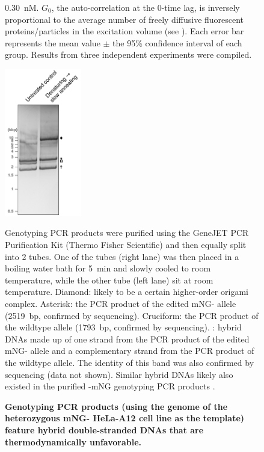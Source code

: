 \begin{figure}
\SI{0.30}{nM}. $G_0$, the auto-correlation at the 0-time lag, is inversely proportional to the average number of freely diffusive fluorescent proteins/particles in the excitation volume (see ). Each error bar represents the mean value $\pm$ the 95\% confidence interval of each group. Results from three independent experiments were compiled.
\end{figure}

\begin{figure}
    \centering
    \includegraphics[width=0.3\textwidth]{chapters/figures/HybridGenotypingdsDNA.pdf}
    \caption{\textbf{Genotyping PCR products (using the genome of the heterozygous mNG- HeLa-A12 cell line as the template) feature hybrid double-stranded DNAs that are thermodynamically unfavorable.}}
    \noindent\justifying Genotyping PCR products were purified using the GeneJET PCR Purification Kit (Thermo Fisher Scientific) and then equally split into 2 tubes. One of the tubes (right lane) was then placed in a boiling water bath for \SI{5}{min} and slowly cooled to room temperature, while the other tube (left lane) sit at room temperature. Diamond: likely to be a certain higher-order origami complex. Asterisk: the PCR product of the edited mNG- allele (\SI{2519}{bp}, confirmed by sequencing). Cruciform: the PCR product of the wildtype  allele (\SI{1793}{bp}, confirmed by sequencing). \underline{\textOmega{}}: hybrid DNAs made up of one strand from the PCR product of the edited mNG- allele and a complementary strand from the PCR product of the wildtype  allele. The identity of this band was also confirmed by sequencing (data not shown). Similar hybrid DNAs likely also existed in the purified -mNG genotyping PCR products .
    \label{HybridGenotypingdsDNA}
\end{figure}

